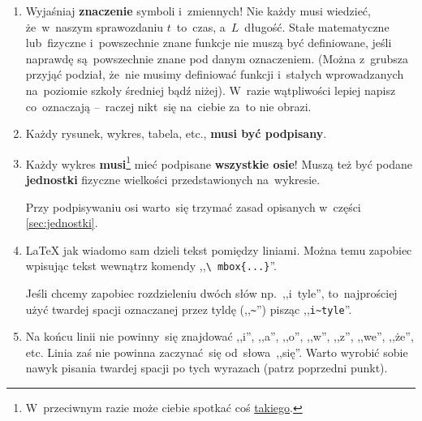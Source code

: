 \documentclass[a4paper,11pt]{article}
\newcommand{\tbs}{\textbackslash}  %
\newcommand{\tb}{\textbf}
\begin{document}
\begin{enumerate}
\item Wyjaśniaj \textbf{znaczenie} symboli i~zmiennych! Nie każdy musi
  wiedzieć, że~w~naszym sprawozdaniu $t$~to~czas, a~$L$~długość. Stałe
  matematyczne lub~fizyczne i~powszechnie znane funkcje nie muszą być
  definiowane, jeśli naprawdę są~powszechnie znane pod danym
  oznaczeniem. (Można z~grubsza przyjąć podział, że~nie musimy
  definiować funkcji i~stałych wprowadzanych na~poziomie szkoły
  średniej bądź niżej). W~razie wątpliwości lepiej napisz co~oznaczają
  --~raczej nikt~się na~ciebie za~to nie obrazi.
\item Każdy rysunek, wykres, tabela, etc., \textbf{musi być
    podpisany}.
\item Każdy wykres \tb{musi}\footnote{W~przeciwnym razie może ciebie
    spotkać coś \href{https://xkcd.com/833/}{takiego}.} mieć podpisane
  \textbf{wszystkie osie}! Muszą też być podane \tb{jednostki}
  fizyczne wielkości przedstawionych na~wykresie.

  Przy podpisywaniu osi warto~się trzymać zasad opisanych w~części
  \eqref{sec:jednostki}.
\item \LaTeX{} jak wiadomo sam dzieli tekst pomiędzy liniami. Można
  temu zapobiec wpisując tekst wewnątrz komendy ,,\texttt{\tbs
    mbox\{...\}}''.

  Jeśli chcemy zapobiec rozdzieleniu dwóch słów np.~,,i~tyle'',
  to~najprościej użyć twardej spacji oznaczanej przez tyldę
  (,,\verb+~+'') pisząc ,,\verb+i~tyle+''.
\item Na końcu linii nie powinny~się znajdować ,,i'', ,,a'', ,,o'',
  ,,w'', ,,z'', ,,we'', ,,że'', etc. Linia zaś nie powinna
  zaczynać~się od~słowa~,,się''. Warto wyrobić sobie nawyk pisania
  twardej spacji po tych wyrazach (patrz poprzedni punkt).


\end{enumerate}
\end{document}
